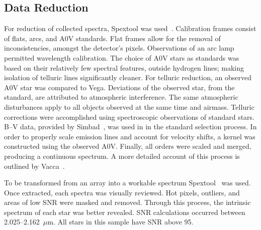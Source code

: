 \subsection{Data Reduction}

For reduction of collected spectra, Spextool was used~\cite{Cushing_2004}. 
Calibration frames consist of flats, arcs, and A0V standards.  Flat frames allow for the removal of inconsistencies, amongst the detector's pixels.  Observations of an arc lamp permitted wavelength calibration.  The choice of A0V stars as standards was based on their relatively few spectral features, outside hydrogen lines; making isolation of telluric lines significantly cleaner.  
For telluric reduction, an observed A0V star was compared to Vega.  Deviations of the observed star, from the standard, are attributed to atmospheric interference.  The same atmospheric disturbances apply to all objects observed at the same time and airmass.  Telluric corrections were accomplished using spectroscopic observations of standard stars. B--V data, provided by Simbad~\cite{simbad}, was used in in the standard selection process.
In order to properly scale emission lines and account for velocity shifts, a kernel was constructed using the observed A0V.  Finally, all orders were scaled and merged, producing a continuous spectrum.
A more detailed account of this process is outlined by Vacca~\cite{Vacca_2003}.  



To be transformed from an array into a workable spectrum Spextool~\cite{Cushing_2004} was used.  Once extracted, each spectra was visually reviewed.  Hot pixels, outliers, and areas of low SNR were masked and removed.  Through this process, the intrinsic spectrum of each star was better revealed.  SNR calculations occurred between 2.025--2.162~$\mu$m.  
All stars in this sample have SNR above 95.